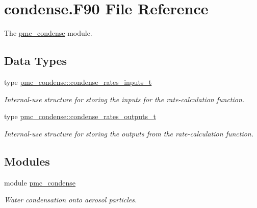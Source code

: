 \hypertarget{condense_8_f90}{}\section{condense.\+F90 File Reference}
\label{condense_8_f90}


The \mbox{\hyperlink{namespacepmc__condense}{pmc\+\_\+condense}} module.  


\subsection*{Data Types}
\begin{DoxyCompactItemize}
\item 
type \mbox{\hyperlink{structpmc__condense_1_1condense__rates__inputs__t}{pmc\+\_\+condense\+::condense\+\_\+rates\+\_\+inputs\+\_\+t}}
\begin{DoxyCompactList}\small\item\em Internal-\/use structure for storing the inputs for the rate-\/calculation function. \end{DoxyCompactList}\item 
type \mbox{\hyperlink{structpmc__condense_1_1condense__rates__outputs__t}{pmc\+\_\+condense\+::condense\+\_\+rates\+\_\+outputs\+\_\+t}}
\begin{DoxyCompactList}\small\item\em Internal-\/use structure for storing the outputs from the rate-\/calculation function. \end{DoxyCompactList}\end{DoxyCompactItemize}
\subsection*{Modules}
\begin{DoxyCompactItemize}
\item 
module \mbox{\hyperlink{namespacepmc__condense}{pmc\+\_\+condense}}
\begin{DoxyCompactList}\small\item\em Water condensation onto aerosol particles. \end{DoxyCompactList}\end{DoxyCompactItemize}
